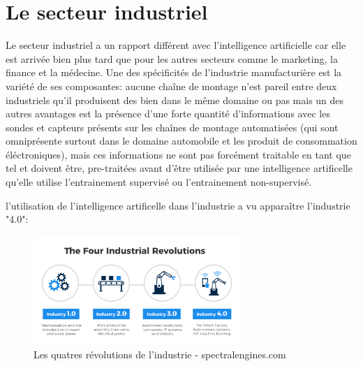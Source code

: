 \section{Le secteur industriel}
Le secteur industriel a un rapport différent avec l'intelligence artificielle car elle est arrivée 
bien plus tard que pour les autres secteurs comme le marketing, la finance et la médecine.
Une des spécificités de l'industrie manufacturière est la variété de ses composantes: 
aucune chaîne de montage n'est pareil entre deux industriels qu'il produisent des bien 
dans le même domaine ou pas mais un des autres avantages est la présence d'une forte quantité 
d'informations avec les sondes et capteurs présents sur les chaînes de montage automatisées 
(qui sont omniprésente surtout dans le domaine automobile et les produit de consommation éléctroniques), 
mais ces informations ne sont pas forcément traitable en tant que tel et doivent être, pre-traitées
avant d'être utilisée par une intelligence artificelle qu'elle utilise l'entrainement 
supervisé ou l'entrainement non-supervisé. \newline

l'utilisation de l'intelligence artificelle dans l'industrie a vu apparaître 
l'industrie "4.0":

\begin{figure}[H]
    \centering
    \includegraphics[width=0.7\textwidth]{Images/industryfour}
    \caption{Les quatres révolutions de l'industrie - spectralengines.com}
	\label{fig:fourindustrialrevolutions}
\end{figure}

